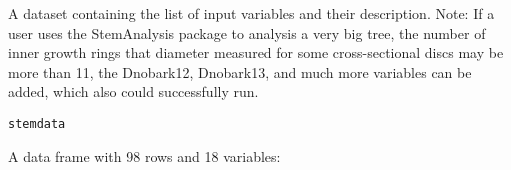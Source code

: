 \documentclass[a4paper]{book}
\begin{document}
%
\begin{Description}\relax
A dataset containing the list of input variables and their description.
Note: If a user uses the StemAnalysis package to analysis a very big
tree, the number of inner growth rings that diameter measured for some
cross-sectional discs may be more than 11, the Dnobark12, Dnobark13, and
much more variables can be added, which also could successfully run.
\end{Description}
%
\begin{Usage}
\begin{verbatim}
stemdata
\end{verbatim}
\end{Usage}
%
\begin{Format}
A data frame with 98 rows and 18 variables:
\begin{description}


\end{description}
\end{Format}
\end{document}
